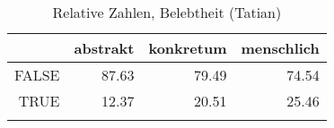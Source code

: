 \begin{table}[ht]
\centering
\begin{tabular}{rrrr}
  \lsptoprule
 & abstrakt & konkretum & menschlich \\ 
  \midrule
FALSE & 87.63 & 79.49 & 74.54 \\ 
  TRUE & 12.37 & 20.51 & 25.46 \\ 
   \lspbottomrule
\end{tabular}
\caption{Relative Zahlen, Belebtheit  (Tatian)} 
\end{table}
